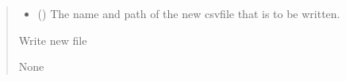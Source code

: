 \documentclass[letterpaper,10pt,english]{sphinxmanual}
\begin{document}
\begin{fulllineitems}
\begin{quote}
\begin{description}
\begin{itemize}
\item {} 
\sphinxAtStartPar
{} () \textendash{} The name and path of the new csv\sphinxhyphen{}file that is to be
written.

\end{itemize}

\sphinxAtStartPar
Write new file

\sphinxAtStartPar
None

\end{description}\end{quote}

\end{fulllineitems}

\end{document}
